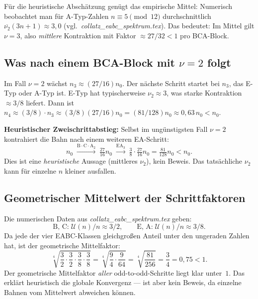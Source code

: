 \documentclass[12pt,a4paper]{article}
\newcommand{\vii}{\nu_2}
\newcommand{\U}{\mathcal{U}}
\begin{document}
Für die heuristische Abschätzung genügt das empirische Mittel:
Numerisch beobachtet man für A-Typ-Zahlen $n \equiv 5 \pmod{12}$
durchschnittlich $\overline{\vii}(3n+1) \approx 3{,}0$ (vgl.\ \textit{collatz\_eabc\_spektrum.tex}).
Das bedeutet: Im Mittel gilt $\nu = 3$, also \emph{mittlere} Kontraktion
mit Faktor $\approx 27/32 < 1$ pro B\textbullet C\textbullet A-Block.

\subsection{Was nach einem B\textbullet C\textbullet A-Block mit $\nu = 2$ folgt}

Im Fall $\nu = 2$ wächst $n_3 \approx (27/16)n_0$. Der nächste Schritt
startet bei $n_3$, das E-Typ oder A-Typ ist. E-Typ hat typischerweise
$\vii \approx 3$, was starke Kontraktion $\approx 3/8$ liefert. Dann ist
$n_4 \approx (3/8) \cdot n_3 \approx (3/8)(27/16)n_0 = (81/128)n_0 \approx 0{,}63\,n_0 < n_0$.

\begin{tcolorbox}[warnung]
\textbf{Heuristischer Zweischrittabstieg:}
Selbst im ungünstigsten Fall $\nu = 2$ kontrahiert die Bahn
nach einem weiteren EA-Schritt:
\[
  n_0 \;\xrightarrow{\text{B}\cdot\text{C}\cdot\text{A}_2}\;
  \tfrac{27}{16}n_0 \;\xrightarrow{\text{EA}_3}\;
  \tfrac{3}{8}\cdot\tfrac{27}{16}n_0 = \tfrac{81}{128}n_0 < n_0.
\]
Dies ist eine \emph{heuristische} Aussage (mittleres $\vii$), kein Beweis.
Das tatsächliche $\vii$ kann für einzelne $n$ kleiner ausfallen.
\end{tcolorbox}

\subsection{Geometrischer Mittelwert der Schrittfaktoren}

Die numerischen Daten aus \textit{collatz\_eabc\_spektrum.tex} geben:
\[
  \text{B, C:}\; \U(n)/n \approx 3/2,\qquad
  \text{E, A:}\; \U(n)/n \approx 3/8.
\]
Da jede der vier EABC-Klassen gleichgroßen Anteil unter den ungeraden Zahlen hat,
ist der geometrische Mittelfaktor:
\[
  \sqrt[4]{\frac{3}{2} \cdot \frac{3}{2} \cdot \frac{3}{8} \cdot \frac{3}{8}}
  = \sqrt[4]{\frac{9}{4} \cdot \frac{9}{64}}
  = \sqrt[4]{\frac{81}{256}}
  = \frac{3}{4} = 0{,}75 < 1.
\]
Der geometrische Mittelfaktor \emph{aller} odd-to-odd-Schritte
liegt klar unter~$1$. Das erklärt heuristisch die globale Konvergenz
--- ist aber kein Beweis, da einzelne Bahnen vom Mittelwert abweichen können.
\end{document}
